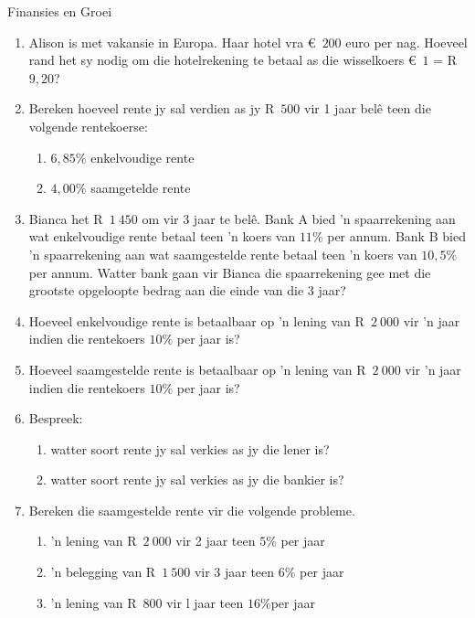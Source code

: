 \begin{eocexercises}{Finansies en Groei}
    \begin{enumerate}[label=\textbf{\arabic*}.]
	\item Alison is met vakansie in Europa. Haar hotel vra €~$200$ euro per nag. Hoeveel rand het sy nodig om die hotelrekening te betaal as die wisselkoers  €~$1$ = R~$9,20$?

	\item Bereken hoeveel rente jy sal verdien as jy R~$500$ vir 1 jaar belê teen die volgende rentekoerse:
	\begin{enumerate}
	    \item $6,85\%$ enkelvoudige rente
	    \item $4,00\%$ saamgetelde rente
	\end{enumerate}

	\item Bianca het R~$1~450$ om vir 3 jaar te belê. Bank A bied ’n spaarrekening aan wat enkelvoudige rente betaal
teen ’n koers van $11\%$ per annum. Bank B bied ’n spaarrekening aan wat saamgestelde rente betaal
teen ’n koers van $10,5\%$ per annum. Watter bank gaan vir Bianca die spaarrekening gee met die grootste
opgeloopte bedrag aan die einde van die 3 jaar?

	\item Hoeveel enkelvoudige rente is betaalbaar op ’n lening van R~$2~000$ vir ’n jaar indien die rentekoers $10\%$ per jaar is?

	\item Hoeveel saamgestelde rente is betaalbaar op ’n lening van  R~$2~000$ vir ’n jaar indien die rentekoers $10\%$ per jaar is?

	\item Bespreek:
	\begin{enumerate}
	    \item watter soort rente jy sal verkies as jy die lener is?

	    \item watter soort rente jy sal verkies as jy die bankier is?
	\end{enumerate}

	\item Bereken die saamgestelde rente vir die volgende probleme.
	\begin{enumerate}
	    \item ’n lening van R~$2~000$ vir 2 jaar teen  $5\%$ per jaar
	    \item ’n belegging van  R~$1~500$ vir 3 jaar teen $6\%$ per jaar
	    \item ’n lening van R~$800$ vir l jaar teen $16\%$per jaar
	\end{enumerate}


\end{enumerate}
\end{eocexercises}
